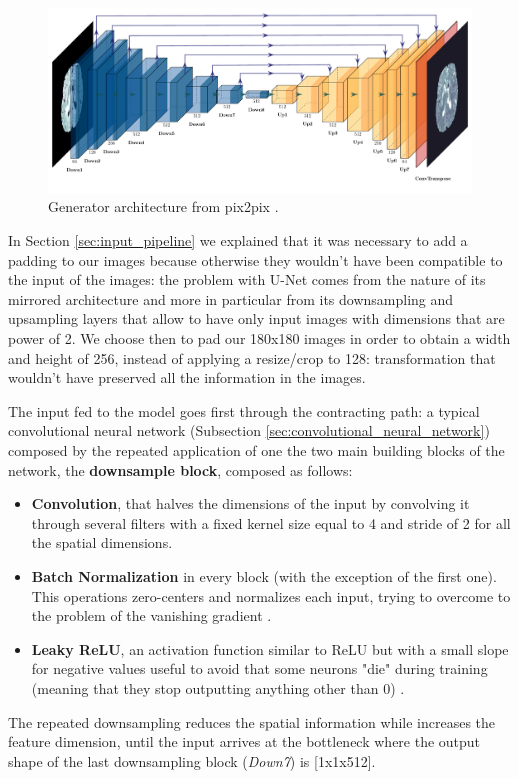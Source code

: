 \begin{figure}[H]
\centering
\includegraphics[height=0.266\textheight]{images/pix2pix_generator.pdf}
\caption[Generator architecture from pix2pix]{Generator architecture from pix2pix \cite{pix2pix}.}
\label{fig:pix2pix_generator}
\end{figure}

In Section \ref{sec:input_pipeline} we explained that it was necessary to add a padding to our images because otherwise they wouldn't have been compatible to the input of the images: the problem with U-Net comes from the nature of its mirrored architecture and more in particular from its downsampling and upsampling layers that allow to have only input images with dimensions that are power of 2. We choose then to pad our 180x180 images in order to obtain a width and height of 256, instead of applying a resize/crop to 128: transformation that wouldn't have preserved all the information in the images. 

\vspace{2mm} %
The input fed to the model goes first through the contracting path: a typical convolutional neural network (Subsection \ref{sec:convolutional_neural_network}) composed by the repeated application of one the two main building blocks of the network, the \textbf{downsample block}, composed as follows:

\begin{itemize}
\item \textbf{Convolution}, that halves the dimensions of the input by convolving it through several filters with a fixed kernel size equal to 4 and stride of 2 for all the spatial dimensions.
\item \textbf{Batch Normalization} in every block (with the exception of the first one). This operations zero-centers and normalizes each input, trying to overcome to the problem of the vanishing gradient \cite[p.~728]{hands_on_ml}.
\item \textbf{Leaky ReLU}, an activation function similar to ReLU but with a small slope for negative values useful to avoid that some neurons "die" during training (meaning that they stop outputting anything other than 0) \cite[p.~720]{hands_on_ml}.
\end{itemize}
The repeated downsampling reduces the spatial information while increases the feature dimension, until the input arrives at the bottleneck where the output shape of the last downsampling block (\textit{Down7}) is [1x1x512].

